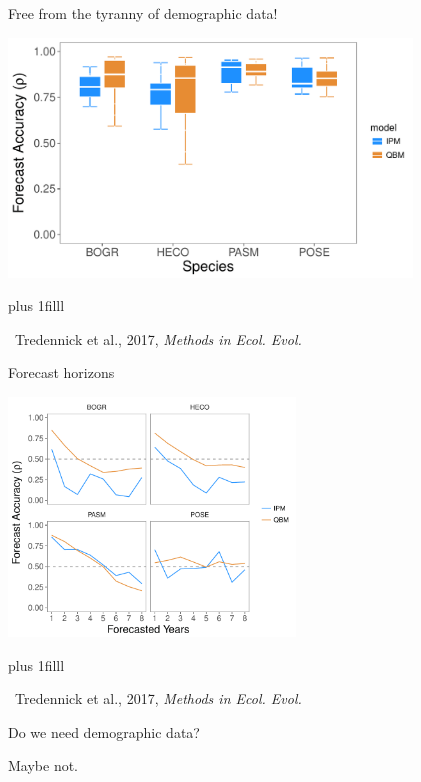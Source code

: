 \documentclass[14pt, compress, aspectratio=1610]{beamer}
\newcommand{\btVFill}{\vskip0pt plus 1filll}
\newcommand{\credit}[1]{\btVFill\par\hfill \footnotesize ~#1}
\begin{document}
\begin{frame}{%
\protect\hypertarget{free-from-the-tyranny-of-demographic-data-1}{%
Free from the tyranny of demographic data!}}

\centering

\includegraphics[height=2.5in]{./figures/mee_forecast_accuracy.pdf}

\credit{Tredennick et al., 2017, \emph{Methods in Ecol. Evol.}}

\end{frame}

\begin{frame}{%
\protect\hypertarget{forecast-horizons}{%
Forecast horizons}}

\centering

\includegraphics[height=2.5in]{./figures/mee_horizons.pdf}

\credit{Tredennick et al., 2017, \emph{Methods in Ecol. Evol.}}

\end{frame}

\begin{frame}{%
\protect\hypertarget{do-we-need-demographic-data}{%
Do we need demographic data?}}

\centering

Maybe not.

\end{frame}
\end{document}
